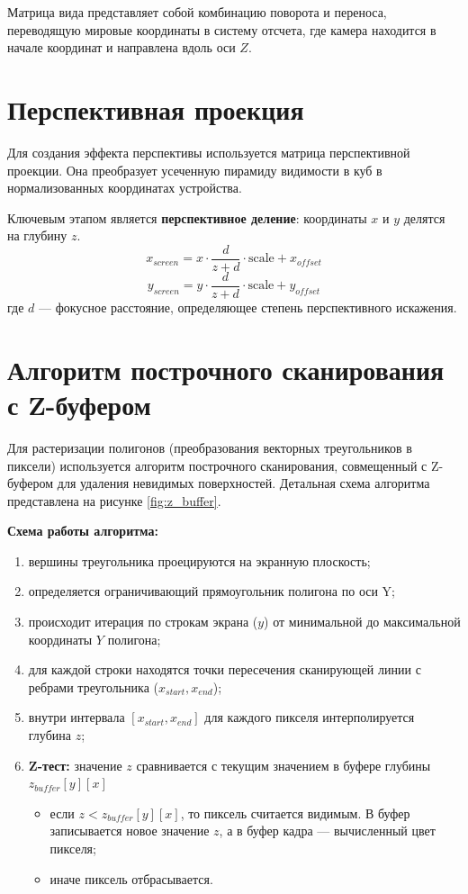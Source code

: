 Матрица вида представляет собой комбинацию поворота и переноса, переводящую мировые координаты в систему отсчета, где камера находится в начале координат и направлена вдоль оси $Z$.

\section{Перспективная проекция}

Для создания эффекта перспективы используется матрица перспективной проекции. Она преобразует усеченную пирамиду видимости в куб в нормализованных координатах устройства.

Ключевым этапом является \textbf{перспективное деление}: координаты $x$ и $y$ делятся на глубину $z$.
\begin{equation}
	x_{screen} = x \cdot \frac{d}{z + d} \cdot \text{scale} + x_{offset}
\end{equation}
\begin{equation}
	y_{screen} = y \cdot \frac{d}{z + d} \cdot \text{scale} + y_{offset}
\end{equation}
где $d$ — фокусное расстояние, определяющее степень перспективного искажения.

\section{Алгоритм построчного сканирования с Z-буфером}

Для растеризации полигонов (преобразования векторных треугольников в пиксели) используется алгоритм построчного сканирования, совмещенный с Z-буфером для удаления невидимых поверхностей. Детальная схема алгоритма представлена на рисунке \ref{fig:z_buffer}.

\textbf{Схема работы алгоритма:}
\begin{enumerate}
	\item вершины треугольника проецируются на экранную плоскость;
	\item определяется ограничивающий прямоугольник полигона по оси Y;
	\item происходит итерация по строкам экрана ($y$) от минимальной до максимальной координаты $Y$ полигона;
	\item для каждой строки находятся точки пересечения сканирующей линии с ребрами треугольника ($x_{start}, x_{end}$);
	\item внутри интервала $[x_{start}, x_{end}]$ для каждого пикселя интерполируется глубина $z$;
	\item \textbf{Z-тест:} значение $z$ сравнивается с текущим значением в буфере глубины $z_{buffer}[y][x]$
	\begin{itemize}
		\item если $z < z_{buffer}[y][x]$, то пиксель считается видимым. В буфер записывается новое значение $z$, а в буфер кадра — вычисленный цвет пикселя;
		\item иначе пиксель отбрасывается.
	\end{itemize}
\end{enumerate}

